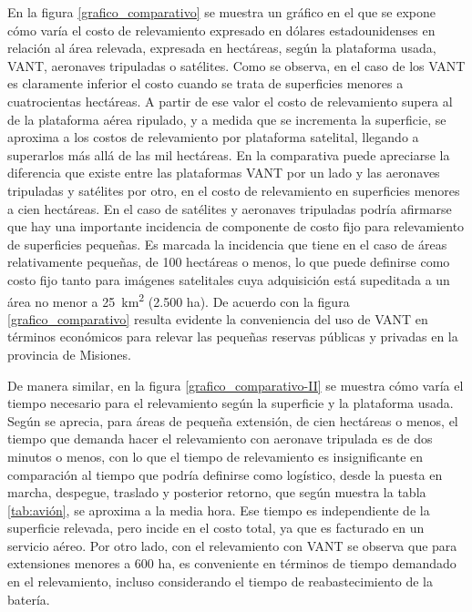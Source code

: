 En la figura \ref{grafico_comparativo} se muestra un gráfico en el que se expone cómo varía el costo de relevamiento expresado en dólares estadounidenses en relación al área relevada, expresada en hectáreas, según la plataforma usada, VANT, aeronaves tripuladas o satélites. Como se observa, en el caso de los VANT es claramente inferior el costo cuando se trata de superficies menores a cuatrocientas hectáreas. A partir de ese valor el costo de relevamiento supera al de la plataforma aérea ripulado, y a medida que se incrementa la superficie, se aproxima a los costos de relevamiento por plataforma satelital, llegando a superarlos más allá de las mil hectáreas. En la comparativa puede apreciarse la diferencia que existe entre las plataformas VANT por un lado y las aeronaves tripuladas y satélites por otro, en el costo de relevamiento en superficies menores a cien hectáreas. En el caso de satélites y aeronaves tripuladas podría afirmarse que hay una importante incidencia de componente de costo fijo para relevamiento de superficies pequeñas. Es marcada la incidencia que tiene en el caso de áreas relativamente pequeñas, de 100 hectáreas o menos, lo que puede definirse como costo fijo tanto para imágenes satelitales cuya adquisición está supeditada a un área no menor a \SI{25}{\kilo\metre\squared} (2.500 ha). De acuerdo con la figura \ref{grafico_comparativo} resulta evidente la conveniencia del uso de VANT en términos económicos para relevar las pequeñas reservas públicas y privadas en la provincia de Misiones.

De manera similar, en la figura \ref{grafico_comparativo-II} se muestra cómo varía el tiempo necesario para el relevamiento según la superficie y la plataforma usada. Según se aprecia, para áreas de pequeña extensión, de cien hectáreas o menos, el tiempo que demanda hacer el relevamiento con aeronave tripulada es de dos minutos o menos, con lo que el tiempo de relevamiento es insignificante en comparación al tiempo que podría definirse como logístico, desde la puesta en marcha, despegue, traslado y posterior retorno, que según muestra la tabla \ref{tab:avión}, se aproxima a la media hora. Ese tiempo es independiente de la superficie relevada, pero incide en el costo total, ya que es facturado en un servicio aéreo. Por otro lado, con el relevamiento con VANT se observa que para extensiones menores a 600 ha, es conveniente en términos de tiempo demandado en el relevamiento, incluso considerando el tiempo de reabastecimiento de la batería.


